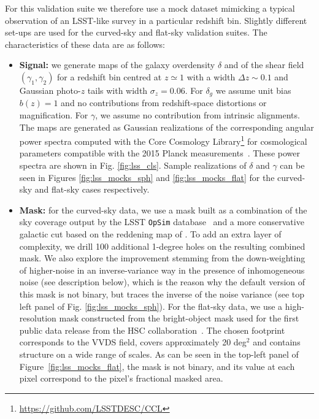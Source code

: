 \documentclass[usenatbib]{mnrasb}
\begin{document}
        For this validation suite we therefore use a mock dataset mimicking a typical observation of an LSST-like survey in a particular redshift bin. Slightly different set-ups are used for the curved-sky and flat-sky validation suites. The characteristics of these data are as follows:
        \begin{itemize}
          \item {\bf Signal:} we generate maps of the galaxy overdensity $\delta$ and of the shear field $(\gamma_1,\gamma_2)$ for a redshift bin centred at $z\simeq1$ with a width $\Delta z\sim0.1$ and Gaussian photo-$z$ tails with width $\sigma_z=0.06$. For $\delta_g$ we assume unit bias $b(z)=1$ and no contributions from redshift-space distortions or magnification. For $\gamma$, we assume no contribution from intrinsic alignments. The maps are generated as Gaussian realizations of the corresponding angular power spectra computed with the Core Cosmology Library\footnote{\url{https://github.com/LSSTDESC/CCL}} for cosmological parameters compatible with the 2015 Planck measurements~\citet{2016A&A...594A..13P}. These power spectra are shown in Fig. \ref{fig:lss_cls}. Sample realizations of $\delta$ and $\gamma$ can be seen in Figures \ref{fig:lss_mocks_sph} and \ref{fig:lss_mocks_flat} for the curved-sky and flat-sky cases respectively.
          \item {\bf Mask:} for the curved-sky data, we use a mask built as a combination of the sky coverage output by the LSST {\tt OpSim} database~\citep{2014SPIE.9150E..15D} and a more conservative galactic cut based on the reddening map of \citet{1998wfsc.conf..297S}. To add an extra layer of complexity, we drill 100 additional 1-degree holes on the resulting combined mask. We also explore the improvement stemming from the down-weighting of higher-noise in an inverse-variance way in the presence of inhomogeneous noise (see description below), which is the reason why the default version of this mask is not binary, but traces the inverse of the noise variance (see top left panel of Fig. \ref{fig:lss_mocks_sph}). For the flat-sky data, we use a high-resolution mask constructed from the bright-object mask used for the first public data release from the HSC collaboration~\citep{2018PASJ...70S...4A}. The chosen footprint corresponds to the VVDS field, covers approximately 20 deg$^2$ and contains structure on a wide range of scales. As can be seen in the top-left panel of Figure~\ref{fig:lss_mocks_flat}, the mask is not binary, and its value at each pixel correspond to the pixel's fractional masked area.

\end{itemize}
\end{document}

